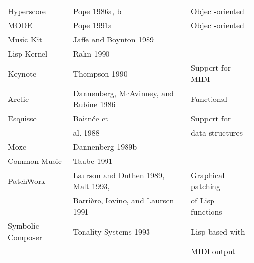 \begin{table}[htbp]
\begin{tabular}{ *{3}{l} }
		Hyperscore & Pope 1986a, b & Object-oriented \\
		MODE & Pope 1991a & Object-oriented \\
		Music Kit & Jaffe and Boynton 1989 & \\
		Lisp Kernel & Rahn 1990 & \\
		Keynote & Thompson 1990 & Support for MIDI \\
		Arctic & Dannenberg, McAvinney, and Rubine 1986 & Functional \\
		Esquisse & Baisnée et & Support for \\
		& al. 1988 & data structures \\
		Moxc & Dannenberg 1989b & \\
		Common Music & Taube 1991 & \\
		PatchWork & Laurson and Duthen 1989, Malt 1993, & Graphical patching \\
		& Barrière, Iovino, and Laurson 1991 & of Lisp functions \\
		Symbolic Composer & Tonality Systems 1993 & Lisp-based with \\
		&& MIDI output \\
		\hline
	\end{tabular}
\end{table}

